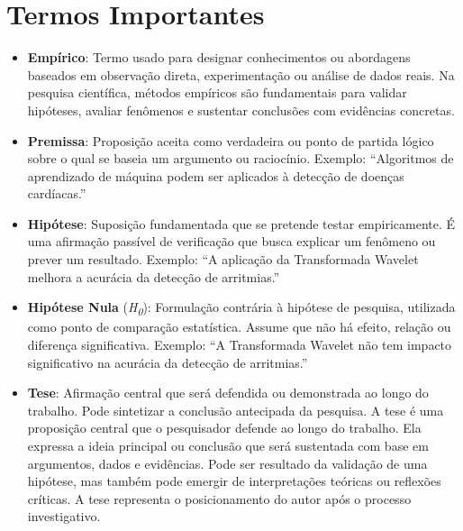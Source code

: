 
\section{Termos Importantes}
\begin{itemize}

    \item \textbf{Empírico}: Termo usado para designar conhecimentos ou abordagens baseados em observação direta, experimentação ou análise de dados reais. Na pesquisa científica, métodos empíricos são fundamentais para validar hipóteses, avaliar fenômenos e sustentar conclusões com evidências concretas.

  \item \textbf{Premissa}: Proposição aceita como verdadeira ou ponto de partida lógico sobre o qual se baseia um argumento ou raciocínio. Exemplo: ``Algoritmos de aprendizado de máquina podem ser aplicados à detecção de doenças cardíacas.''

  \item \textbf{Hipótese}: Suposição fundamentada que se pretende testar empiricamente. É uma afirmação passível de verificação que busca explicar um fenômeno ou prever um resultado. Exemplo: ``A aplicação da Transformada Wavelet melhora a acurácia da detecção de arritmias.''

  \item \textbf{Hipótese Nula} (\textit{H\textsubscript{0}}): Formulação contrária à hipótese de pesquisa, utilizada como ponto de comparação estatística. Assume que não há efeito, relação ou diferença significativa. Exemplo: ``A Transformada Wavelet não tem impacto significativo na acurácia da detecção de arritmias.''

  \item \textbf{Tese}: Afirmação central que será defendida ou demonstrada ao longo do trabalho. Pode sintetizar a conclusão antecipada da pesquisa. A tese é uma proposição central que o pesquisador defende ao longo do trabalho. Ela expressa a ideia principal ou conclusão que será sustentada com base em argumentos, dados e evidências. Pode ser resultado da validação de uma hipótese, mas também pode emergir de interpretações teóricas ou reflexões críticas. A tese representa o posicionamento do autor após o processo investigativo.


\end{itemize}

